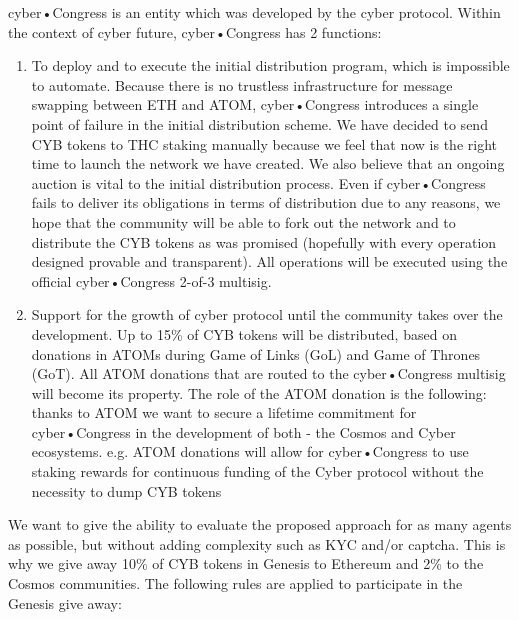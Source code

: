 \documentclass[8pt,oneside]{amsart}
\begin{document}
\begin{Abstract}
cyber•Congress is an entity which was developed by the cyber protocol. Within the context of cyber future, cyber•Congress has 2 functions:
\begin{enumerate}
 \item To deploy and to execute the initial distribution program, which is impossible to automate. Because there is no trustless infrastructure for message swapping between ETH and ATOM, cyber•Congress introduces a single point of failure in the initial distribution scheme. We have decided to send CYB tokens to THC staking manually because we feel that now is the right time to launch the network we have created. We also believe that an ongoing auction is vital to the initial distribution process. Even if cyber•Congress fails to deliver its obligations in terms of distribution due to any reasons, we hope that the community will be able to fork out the network and to distribute the CYB tokens as was promised (hopefully with every operation designed provable and transparent). All operations will be executed using the official cyber•Congress 2-of-3 multisig.
 \item Support for the growth of cyber protocol until the community takes over the development. Up to 15\% of CYB tokens will be distributed, based on donations in ATOMs during Game of Links (GoL) and Game of Thrones (GoT). All ATOM donations that are routed to the cyber•Congress multisig will become its property. The role of the ATOM donation is the following: thanks to ATOM we want to secure a lifetime commitment for cyber•Congress in the development of both - the Cosmos and Cyber ecosystems. e.g. ATOM donations will allow for cyber•Congress to use staking rewards for continuous funding of the Cyber protocol without the necessity to dump CYB tokens
\end{enumerate}

We want to give the ability to evaluate the proposed approach for as many agents as possible, but without adding complexity such as KYC and/or captcha. This is why we give away 10\% of CYB tokens in Genesis to Ethereum and 2\% to the Cosmos communities. The following rules are applied to participate in the Genesis give away:



\end{Abstract}
\end{document}
